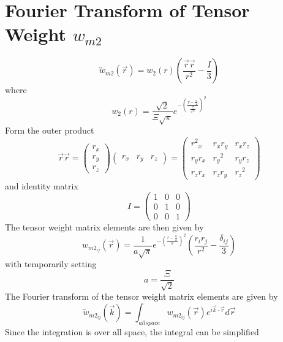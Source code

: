 \documentclass[double,12pt]{beavtex}
\begin{document}
\section{Fourier Transform of Tensor Weight $w_{m2}$}
\begin{equation}{\overleftrightarrow{w}_{m2}(\vec{r})=w_2(r)\left(\frac{\vec{r}\vec{r}}{r^2}-\frac{I}{3}\right)}\end{equation}
where
\begin{equation}{w_2(r)=\frac{\sqrt{2}}{\Xi\sqrt{\pi}}e^{-\left(\frac{r-\frac{\alpha}{2}}{\frac{\Xi}{\sqrt{2}}}\right)^2}}\end{equation}
Form the outer product
\begin{equation}{\vec{r}\vec{r}=\left(\begin{array}{c} r_x \\ r_y \\ r_z \end{array} \right) \left(\begin{array}{rrr} r_x & r_y & r_z \end{array} \right)=\left(\begin{array}{ccc} {r^2}_x & r_xr_y & r_xr_z \\ r_yr_x & {r_y}^2 & r_yr_z \\ r_zr_x & r_zr_y & {r_z}^2 \end{array}\right)}\end{equation}
and identity matrix
\begin{equation}{I=\left(\begin{array}{ccc} 1 & 0 & 0 \\ 0 & 1 & 0 \\ 0 & 0 & 1 \end{array}\right)}\end{equation}
The tensor weight matrix elements are then given by
\begin{equation}{w_{m2_{ij}}(\vec{r})=\frac{1}{a\sqrt{\pi}}e^{-\left(\frac{r-\frac{\alpha}{2}}{a}\right)^2}\left(\frac{r_ir_j}{r^2}-\frac{\delta_{ij}}{3}\right)}\end{equation}
with temporarily setting
\begin{equation}{a=\frac{\Xi}{\sqrt{2}}}\end{equation}
The Fourier transform of the tensor weight matrix elements are given by
\begin{equation}{\widetilde{w}_{m2_{ij}}(\vec{k})=\int_{allspace}{w_{{m2}_{ij}}}(\vec{r})e^{i\vec{k}\cdot\vec{r}}d{\vec{r}}}\end{equation}
Since the integration is over all space, the integral can be simplified 
\end{document}
